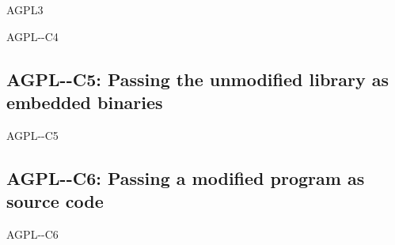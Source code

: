 \begin{license}{AGPL3}
\begin{lsuc}{AGPL-\ver-C4}
  \begin{lsucprohibits}
    \lsucitem{\noPatentLitigation}
  \end{lsucprohibits}
\end{lsuc}

\subsection{AGPL-\ver-C5: Passing the unmodified library as embedded binaries} 
\begin{lsuc}{AGPL-\ver-C5}

  \useCaseFive

  \begin{lsucrequires}
    \lsucmandatory{\keepLicenseElements}
    \lsucmandatory{\gplthreeEnsureCopyrightNoticeBinary}
    \lsucmandatory{\giveLicense}\passingFilesCorrectly
    \lsucmandatory{\makeAllSourcesAvailable}
    \lsucmandatory{\describeHowToGetSource}
    \lsucmandatory{\addToCopyrightDialogLib}
    \lsucmandatory{\arrangeEnclosingBinaries}
    \lsucmandatory{\retainCopyrightNotices}
    \lsucoptional{\addToDocumentation}
  \end{lsucrequires}

  \begin{lsucprohibits}
    \lsucitem{\noPatentLitigation}
  \end{lsucprohibits}
\end{lsuc}

\subsection{AGPL-\ver-C6: Passing a modified program as source code}
\begin{lsuc}{AGPL-\ver-C6}

  \useCaseSix

  \begin{lsucrequires}
    \lsucmandatory{\keepLicenseElements}
    \lsucmandatory{\gplthreeEnsureCopyrightNoticeSource}
    \lsucmandatory{\giveLicense}\passingFilesCorrectly
    \lsucmandatory{\retainCopyrightNotices}
    \lsucmandatory{\addToCopyrightDialogApp}
    \lsucmandatory{\markProgramModifications}
    \lsucmandatory{\arrangeProgramChanges}\howToApplyTheseTerms
    \lsucoptional{\createChangelog}
    \lsucoptional{\addToDocumentation}
  \end{lsucrequires}


\end{lsuc}
\end{license}
